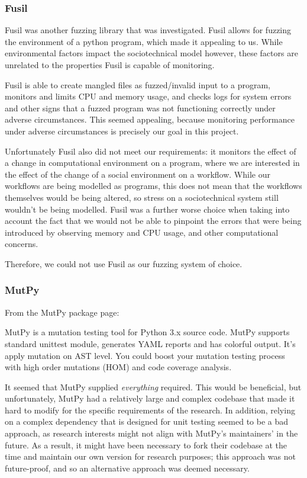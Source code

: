 \documentclass[11pt, twocolumn]{article}
\begin{document}
\subsubsection{Fusil}
\label{fuzzing_fuzil}
Fusil was another fuzzing library that was investigated. Fusil allows for fuzzing the environment of a python program, which made it appealing to us. While environmental factors impact the sociotechnical model however, these factors are unrelated to the properties Fusil is capable of monitoring. \par
Fusil is able to create mangled files as fuzzed/invalid input to a program, monitors and limits CPU and memory usage, and checks logs for system errors and other signs that a fuzzed program was not functioning correctly under adverse circumstances. This seemed appealing, because monitoring performance under adverse circumstances is precisely our goal in this project. \par
Unfortunately Fusil also did not meet our requirements: it monitors the effect of a change in computational environment on a program, where we are interested in the effect of the change of a social environment on a workflow. While our workflows are being modelled as programs, this does not mean that the workflows themselves would be being altered, so stress on a sociotechnical system still wouldn't be being modelled. Fusil was a further worse choice when taking into account the fact that we would not be able to pinpoint the errors that were being introduced by observing memory and CPU usage, and other computational concerns. \par
Therefore, we could not use Fusil as our fuzzing system of choice. \par

\subsubsection{MutPy} 
\label{fuzzing_mutpy}
From the MutPy package page\cite{MutPy26:online}: 
\begin{displayquote}
MutPy is a mutation testing tool for Python 3.x source code. MutPy supports standard unittest module, generates YAML reports and has colorful output. It’s apply mutation on AST level. You could boost your mutation testing process with high order mutations (HOM) and code coverage analysis.
\end{displayquote}\par

It seemed that MutPy supplied \emph{everything} required. This would be beneficial, but unfortunately, MutPy had a relatively large and complex codebase\cite{khala8:online} that made it hard to modify for the specific requirements of the research. In addition, relying on a complex dependency that is designed for unit testing seemed to be a bad approach, as research interests might not align with MutPy's maintainers' in the future. As a result, it might have been necessary to fork their codebase at the time and maintain our own version for research purposes; this approach was not future-proof, and so an alternative approach was deemed necessary. \par
\end{document}
